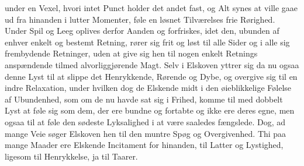 \documentclass[12pt,a4paper]{book}
\newcommand{\apage}[1]{\marginnote{\footnotesize\textit{[#1]}}}
\begin{document}
under en Vexel, hvori intet Punct holder det andet fast, og Alt synes at
ville gaae ud fra hinanden i lutter Momenter, føle en løsnet
Tilværelses frie Rørighed. Under Spil og Leeg oplives derfor Aanden og
forfriskes, idet den, ubunden af enhver enkelt og bestemt Retning, rører
sig frit og løst til alle Sider og i alle sig frembydende Retninger,
uden at give sig hen til nogen enkelt Retnings anspændende tilmed
\apage{53} alvorliggjørende Magt. Selv i Elskoven yttrer sig da nu ogsaa denne Lyst
til at slippe det Henrykkende, Rørende og Dybe, og overgive sig til en
indre Relaxation, under hvilken dog de Elskende midt i den øieblikkelige
Følelse af Ubundenhed, som om de nu havde sat sig i Frihed, komme til
med dobbelt Lyst at føle sig som dem, der ere bundne og fortabte og ikke
ere deres egne, men ogsaa til at føle den sødeste Lyksalighed i at være
saaledes fængslede. Dog, ad mange Veie søger Elskoven hen til den muntre
Spøg og Overgivenhed. Thi paa mange Maader ere Elskende Incitament for
hinanden, til Latter og Lystighed, ligesom til Henrykkelse, ja til
Taarer.
\end{document}
